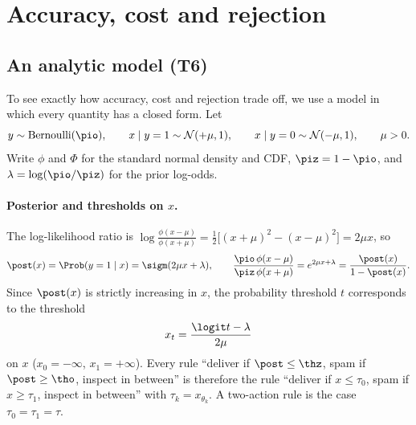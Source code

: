 \section{Accuracy, cost and rejection}
\label{sec:accuracy-cost}

\subsection{An analytic model (T6)}
\label{sec:t6}

To see exactly how accuracy, cost and rejection trade off, we use a model in which every
quantity has a closed form. Let
\[
  y \sim \mathrm{Bernoulli}(\pio), \qquad x \mid y=1 \sim \mathcal N(+\mu, 1), \qquad
  x \mid y=0 \sim \mathcal N(-\mu, 1), \qquad \mu > 0 .
\]
Write $\phi$ and $\Phi$ for the standard normal density and CDF, $\piz = 1-\pio$, and
$\lambda = \log(\pio/\piz)$ for the prior log-odds.

\paragraph{Posterior and thresholds on $x$.}
The log-likelihood ratio is
$\log\frac{\phi(x-\mu)}{\phi(x+\mu)} = \tfrac12\big[(x+\mu)^2 - (x-\mu)^2\big] = 2\mu x$, so
\begin{equation}
  \post(x) = \Prob(y=1\mid x) = \sigm(2\mu x + \lambda),
  \qquad
  \frac{\pio\,\phi(x-\mu)}{\piz\,\phi(x+\mu)} = e^{2\mu x+\lambda} = \frac{\post(x)}{1-\post(x)} .
  \label{eq:t6-post}
\end{equation}
Since $\post(x)$ is strictly increasing in $x$, the probability threshold $t$ corresponds to the
threshold
\begin{equation}
  x_t = \frac{\logit t - \lambda}{2\mu}
  \label{eq:t6-xt}
\end{equation}
on $x$ ($x_0=-\infty$, $x_1=+\infty$). Every rule ``deliver if $\post\le\thz$, spam if
$\post\ge\tho$, inspect in between'' is therefore the rule ``deliver if $x\le\tau_0$, spam if
$x\ge\tau_1$, inspect in between'' with $\tau_k = x_{\theta_k}$. A two-action rule is the case
$\tau_0=\tau_1=\tau$.

